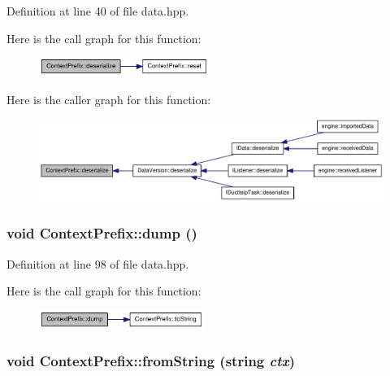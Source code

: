 Definition at line 40 of file data.hpp.

Here is the call graph for this function:\nopagebreak
\begin{figure}[H]
\begin{center}
\leavevmode
\includegraphics[width=157pt]{struct_context_prefix_aaacd69ff83b8a9788a603eaed58cd4e5_cgraph}
\end{center}
\end{figure}


Here is the caller graph for this function:\nopagebreak
\begin{figure}[H]
\begin{center}
\leavevmode
\includegraphics[width=330pt]{struct_context_prefix_aaacd69ff83b8a9788a603eaed58cd4e5_icgraph}
\end{center}
\end{figure}
\hypertarget{struct_context_prefix_ac390a1751dabd906e901ba491f94cc9d}{
\subsubsection[{dump}]{\setlength{\rightskip}{0pt plus 5cm}void ContextPrefix::dump ()}}
\label{struct_context_prefix_ac390a1751dabd906e901ba491f94cc9d}


Definition at line 98 of file data.hpp.

Here is the call graph for this function:\nopagebreak
\begin{figure}[H]
\begin{center}
\leavevmode
\includegraphics[width=152pt]{struct_context_prefix_ac390a1751dabd906e901ba491f94cc9d_cgraph}
\end{center}
\end{figure}
\hypertarget{struct_context_prefix_a793d4b68722e1edd3e1a6272535be5fe}{
\subsubsection[{fromString}]{\setlength{\rightskip}{0pt plus 5cm}void ContextPrefix::fromString (string {\em ctx})}}
\label{struct_context_prefix_a793d4b68722e1edd3e1a6272535be5fe}


